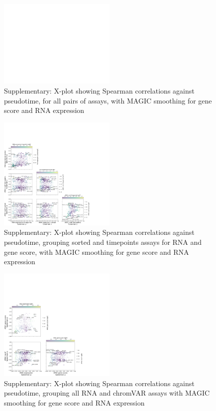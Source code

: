 \documentclass[a4paper]{article}
\begin{document}
\begin{figure}[!htb]
  \centering
  \includegraphics[width=0.5\textwidth]{../figures/hematopoiesis/Basophil_40_109_smooth_magic_detailed_X_plot.png}
  \caption{Supplementary: X-plot showing Spearman correlations against pseudotime, for all pairs of assays, with MAGIC smoothing for gene score and RNA expression}
\end{figure}

\begin{figure}[!htb]
  \centering
  \includegraphics[width=0.5\textwidth]{../figures/hematopoiesis/Basophil_40_109_smooth_magic_semi_detailed_X_plot.png}
  \caption{Supplementary: X-plot showing Spearman correlations against pseudotime, grouping sorted and timepoints assays for RNA and gene score, with MAGIC smoothing for gene score and RNA expression}
\end{figure}

\begin{figure}[!htb]
  \centering
  \includegraphics[width=0.5\textwidth]{../figures/hematopoiesis/Basophil_40_109_smooth_magic_grouped_X_plot.png}
  \caption{Supplementary: X-plot showing Spearman correlations against pseudotime, grouping all RNA and chromVAR assays with MAGIC smoothing for gene score and RNA expression}
\end{figure}
\end{document}
